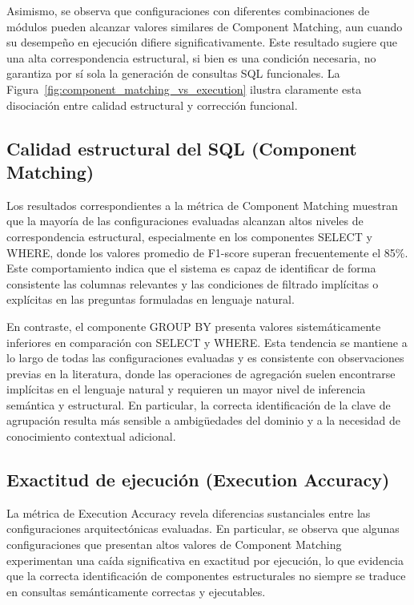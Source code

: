 \documentclass[journal]{IEEEtran}
\begin{document}
Asimismo, se observa que configuraciones con diferentes combinaciones de módulos pueden alcanzar valores similares de Component Matching, aun cuando su desempeño en ejecución difiere significativamente. Este resultado sugiere que una alta correspondencia estructural, si bien es una condición necesaria, no garantiza por sí sola la generación de consultas SQL funcionales. La Figura~\ref{fig:component_matching_vs_execution} ilustra claramente esta disociación entre calidad estructural y corrección funcional.

\subsection{Calidad estructural del SQL (Component Matching)}

Los resultados correspondientes a la métrica de Component Matching muestran que la mayoría de las configuraciones evaluadas alcanzan altos niveles de correspondencia estructural, especialmente en los componentes SELECT y WHERE, donde los valores promedio de F1-score superan frecuentemente el 85\%. Este comportamiento indica que el sistema es capaz de identificar de forma consistente las columnas relevantes y las condiciones de filtrado implícitas o explícitas en las preguntas formuladas en lenguaje natural.

En contraste, el componente GROUP BY presenta valores sistemáticamente inferiores en comparación con SELECT y WHERE. Esta tendencia se mantiene a lo largo de todas las configuraciones evaluadas y es consistente con observaciones previas en la literatura, donde las operaciones de agregación suelen encontrarse implícitas en el lenguaje natural y requieren un mayor nivel de inferencia semántica y estructural. En particular, la correcta identificación de la clave de agrupación resulta más sensible a ambigüedades del dominio y a la necesidad de conocimiento contextual adicional.


\subsection{Exactitud de ejecución (Execution Accuracy)}

La métrica de Execution Accuracy revela diferencias sustanciales entre las configuraciones arquitectónicas evaluadas. En particular, se observa que algunas configuraciones que presentan altos valores de Component Matching experimentan una caída significativa en exactitud por ejecución, lo que evidencia que la correcta identificación de componentes estructurales no siempre se traduce en consultas semánticamente correctas y ejecutables.
\end{document}
